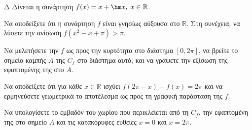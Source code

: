 \begin{thema}{Δ}
Δίνεται η συνάρτηση $\displaystyle f(x) = x + \hm x, \; x \in \mathbb{R}$.
\begin{erwthma}
    \item Να αποδείξετε ότι η συνάρτηση $f$ είναι γνησίως αύξουσα στο $\mathbb{R}$. Στη συνέχεια, να λύσετε την ανίσωση $\displaystyle f(x^2 - x + \pi) > \pi$.
    \item Να μελετήσετε την $f$ ως προς την κυρτότητα στο διάστημα $[0, 2\pi]$, να βρείτε το σημείο καμπής $A$ της $C_f$ στο διάστημα αυτό, και να γράψετε την εξίσωση της εφαπτομένης της στο $A$.
    \item Να αποδείξετε ότι για κάθε $x \in \mathbb{R}$ ισχύει $f(2\pi - x) + f(x) = 2\pi$ και να ερμηνεύσετε γεωμετρικά το αποτέλεσμα ως προς τη γραφική παράσταση της $f$.
    \item Να υπολογίσετε το εμβαδόν του χωρίου που περικλείεται από τη $C_f$, την εφαπτομένη της στο σημείο $A$ και τις κατακόρυφες ευθείες $x=0$ και $x=2\pi$.
\end{erwthma}
\end{thema}
